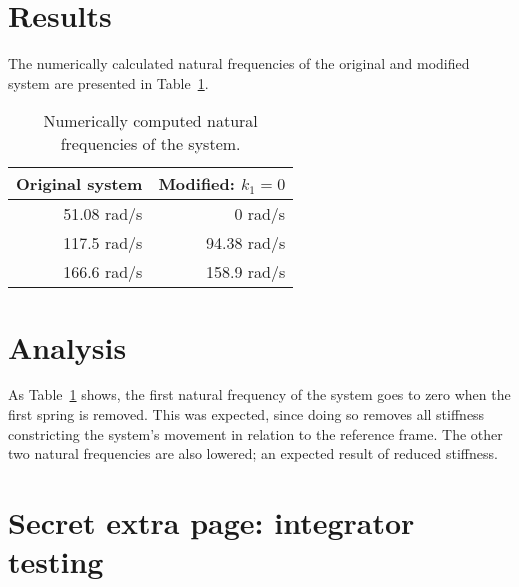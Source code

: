 \documentclass{article}
\begin{document}
	\section*{Results}
	The numerically calculated natural frequencies of the original and modified system are presented in Table~\ref*{tab:natural_frequencies}.
	
	\begin{table}[htb]
		\centering
		\begin{tabular}{|r|r|}
			\hline
			Original system & Modified: $k_1 = 0$ \\
			\hline
			51.08 rad/s & 0 rad/s \\
			117.5 rad/s & 94.38 rad/s \\
			166.6 rad/s & 158.9 rad/s \\
			\hline
		\end{tabular}
		\caption{Numerically computed natural frequencies of the system.}
		\label{tab:natural_frequencies}
	\end{table}

	\section*{Analysis}
	As Table~\ref*{tab:natural_frequencies} shows, the first natural frequency of the system goes to zero when the first spring is removed. This was expected, since doing so removes all stiffness constricting the system's movement in relation to the reference frame. The other two natural frequencies are also lowered; an expected result of reduced stiffness.
	
	\clearpage
	\section*{Secret extra page: integrator testing}
	
\end{document}

